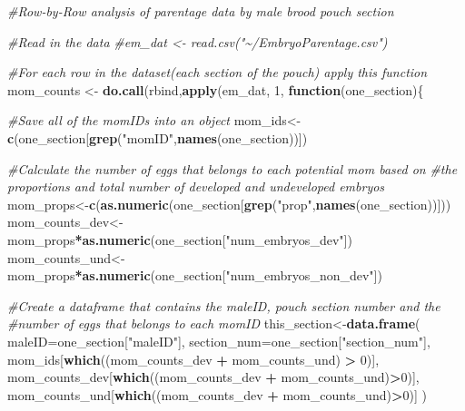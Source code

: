 \documentclass[
]{article}
\newenvironment{Shaded}{\begin{snugshade}}{\end{snugshade}}
\newcommand{\AttributeTok}[1]{\textcolor[rgb]{0.13,0.29,0.53}{#1}}
\newcommand{\CommentTok}[1]{\textcolor[rgb]{0.56,0.35,0.01}{\textit{#1}}}
\newcommand{\ControlFlowTok}[1]{\textcolor[rgb]{0.13,0.29,0.53}{\textbf{#1}}}
\newcommand{\DecValTok}[1]{\textcolor[rgb]{0.00,0.00,0.81}{#1}}
\newcommand{\FunctionTok}[1]{\textcolor[rgb]{0.13,0.29,0.53}{\textbf{#1}}}
\newcommand{\NormalTok}[1]{#1}
\newcommand{\OtherTok}[1]{\textcolor[rgb]{0.56,0.35,0.01}{#1}}
\newcommand{\SpecialCharTok}[1]{\textcolor[rgb]{0.81,0.36,0.00}{\textbf{#1}}}
\newcommand{\StringTok}[1]{\textcolor[rgb]{0.31,0.60,0.02}{#1}}
\begin{document}
\begin{Shaded}
\begin{Highlighting}[]
\CommentTok{\#Row{-}by{-}Row analysis of parentage data by male brood pouch section}

\CommentTok{\#Read in the data}
\CommentTok{\#em\_dat \textless{}{-} read.csv("\textasciitilde{}/EmbryoParentage.csv")}

\CommentTok{\#For each row in the dataset(each section of the pouch) apply this function}
\NormalTok{mom\_counts }\OtherTok{\textless{}{-}} \FunctionTok{do.call}\NormalTok{(rbind,}\FunctionTok{apply}\NormalTok{(em\_dat, }\DecValTok{1}\NormalTok{, }\ControlFlowTok{function}\NormalTok{(one\_section)\{}
  
  \CommentTok{\#Save all of the momIDs into an object}
\NormalTok{  mom\_ids}\OtherTok{\textless{}{-}}\FunctionTok{c}\NormalTok{(one\_section[}\FunctionTok{grep}\NormalTok{(}\StringTok{"momID"}\NormalTok{,}\FunctionTok{names}\NormalTok{(one\_section))])  }
  
  \CommentTok{\#Calculate the number of eggs that belongs to each potential mom based on}
  \CommentTok{\#the proportions and total number of developed and undeveloped embryos}
\NormalTok{  mom\_props}\OtherTok{\textless{}{-}}\FunctionTok{c}\NormalTok{(}\FunctionTok{as.numeric}\NormalTok{(one\_section[}\FunctionTok{grep}\NormalTok{(}\StringTok{"prop"}\NormalTok{,}\FunctionTok{names}\NormalTok{(one\_section))]))}
\NormalTok{  mom\_counts\_dev}\OtherTok{\textless{}{-}}\NormalTok{mom\_props}\SpecialCharTok{*}\FunctionTok{as.numeric}\NormalTok{(one\_section[}\StringTok{"num\_embryos\_dev"}\NormalTok{])}
\NormalTok{  mom\_counts\_und}\OtherTok{\textless{}{-}}\NormalTok{mom\_props}\SpecialCharTok{*}\FunctionTok{as.numeric}\NormalTok{(one\_section[}\StringTok{"num\_embryos\_non\_dev"}\NormalTok{])}
  
  \CommentTok{\#Create a dataframe that contains the maleID, pouch section number and the}
  \CommentTok{\#number of eggs that belongs to each momID}
\NormalTok{  this\_section}\OtherTok{\textless{}{-}}\FunctionTok{data.frame}\NormalTok{(}
    \AttributeTok{maleID=}\NormalTok{one\_section[}\StringTok{"maleID"}\NormalTok{],}
    \AttributeTok{section\_num=}\NormalTok{one\_section[}\StringTok{"section\_num"}\NormalTok{],}
\NormalTok{    mom\_ids[}\FunctionTok{which}\NormalTok{((mom\_counts\_dev }\SpecialCharTok{+}\NormalTok{ mom\_counts\_und) }\SpecialCharTok{\textgreater{}} \DecValTok{0}\NormalTok{)],}
\NormalTok{    mom\_counts\_dev[}\FunctionTok{which}\NormalTok{((mom\_counts\_dev }\SpecialCharTok{+}\NormalTok{ mom\_counts\_und)}\SpecialCharTok{\textgreater{}}\DecValTok{0}\NormalTok{)],}
\NormalTok{    mom\_counts\_und[}\FunctionTok{which}\NormalTok{((mom\_counts\_dev }\SpecialCharTok{+}\NormalTok{ mom\_counts\_und)}\SpecialCharTok{\textgreater{}}\DecValTok{0}\NormalTok{)]}
\NormalTok{  )}
  

\end{Highlighting}
\end{Shaded}
\end{document}
